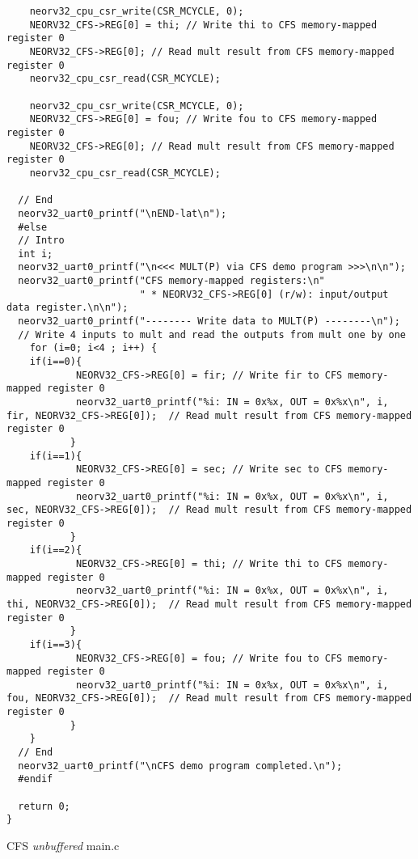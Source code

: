 \begin{code}
\begin{verbatim}
    neorv32_cpu_csr_write(CSR_MCYCLE, 0);
    NEORV32_CFS->REG[0] = thi; // Write thi to CFS memory-mapped register 0
    NEORV32_CFS->REG[0]; // Read mult result from CFS memory-mapped register 0  
    neorv32_cpu_csr_read(CSR_MCYCLE); 

    neorv32_cpu_csr_write(CSR_MCYCLE, 0);
    NEORV32_CFS->REG[0] = fou; // Write fou to CFS memory-mapped register 0
    NEORV32_CFS->REG[0]; // Read mult result from CFS memory-mapped register 0  
    neorv32_cpu_csr_read(CSR_MCYCLE); 

  // End
  neorv32_uart0_printf("\nEND-lat\n");
  #else
  // Intro
  int i;
  neorv32_uart0_printf("\n<<< MULT(P) via CFS demo program >>>\n\n");
  neorv32_uart0_printf("CFS memory-mapped registers:\n"
                       " * NEORV32_CFS->REG[0] (r/w): input/output data register.\n\n");
  neorv32_uart0_printf("-------- Write data to MULT(P) --------\n");
  // Write 4 inputs to mult and read the outputs from mult one by one
    for (i=0; i<4 ; i++) {
    if(i==0){
            NEORV32_CFS->REG[0] = fir; // Write fir to CFS memory-mapped register 0
            neorv32_uart0_printf("%i: IN = 0x%x, OUT = 0x%x\n", i, fir, NEORV32_CFS->REG[0]);  // Read mult result from CFS memory-mapped register 0  
           } 
    if(i==1){
            NEORV32_CFS->REG[0] = sec; // Write sec to CFS memory-mapped register 0
            neorv32_uart0_printf("%i: IN = 0x%x, OUT = 0x%x\n", i, sec, NEORV32_CFS->REG[0]);  // Read mult result from CFS memory-mapped register 0  
           }   
    if(i==2){
            NEORV32_CFS->REG[0] = thi; // Write thi to CFS memory-mapped register 0
            neorv32_uart0_printf("%i: IN = 0x%x, OUT = 0x%x\n", i, thi, NEORV32_CFS->REG[0]);  // Read mult result from CFS memory-mapped register 0  
           }   
    if(i==3){
            NEORV32_CFS->REG[0] = fou; // Write fou to CFS memory-mapped register 0
            neorv32_uart0_printf("%i: IN = 0x%x, OUT = 0x%x\n", i, fou, NEORV32_CFS->REG[0]);  // Read mult result from CFS memory-mapped register 0  
           }   
    } 
  // End
  neorv32_uart0_printf("\nCFS demo program completed.\n");
  #endif

  return 0;
}
\end{verbatim}
\caption{CFS \textit{unbuffered} main.c}
\label{ap-cod:15}
\end{code}

